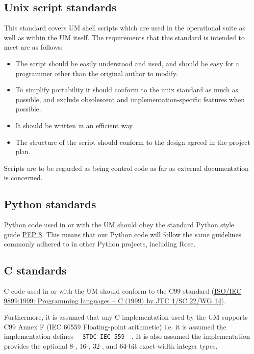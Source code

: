 \subsection{Unix script standards}

This standard covers UM shell scripts which are used in the operational suite as well as within the UM itself. The requirements that this standard is intended to meet are as follows:

\begin{itemize}
  \item The script should be easily understood and used, and should be easy for a programmer other than the original author to modify.
  \item To simplify portability it should conform to the unix standard as much as possible, and exclude obsolescent and implementation-specific features when possible.
  \item It should be written in an efficient way.
  \item The structure of the script should conform to the design agreed in the project plan. 
\end{itemize}

Scripts are to be regarded as being control code as far as external documentation is concerned.


\subsection{Python standards}

Python code used in or with the UM should obey the standard Python style guide 
\href{http://www.python.org/dev/peps/pep-0008/}{PEP 8}. This means that our
Python code will follow the same guidelines commonly adhered to in other Python
projects, including Rose.


\subsection{C standards}
C code used in or with the UM should conform to the C99 standard (\href{http://www.iso.org/iso/iso_catalogue/catalogue_ics/catalogue_detail_ics.htm?csnumber=29237}{ISO/IEC 9899:1999: Programming languages -- C (1999) by JTC 1/SC 22/WG 14}).

Furthermore, it is assumed that any C implementation used by the UM supports C99 Annex F (IEC 60559 Floating-point arithmetic) i.e. it is assumed the implementation defines \verb|__STDC_IEC_559__|.
It is also assumed the implementation provides the optional 8-, 16-, 32-, and 64-bit exact-width integer types.

